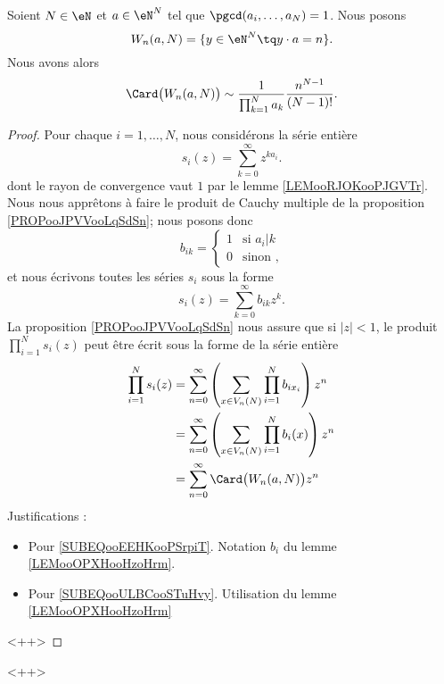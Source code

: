 \begin{theorem} \label{THOooQDYWooCOiUMb}
    Soient \( N\in \eN\) et \( a\in \eN^N\) tel que \( \pgcd(a_i,\ldots, a_{N})=1\). Nous posons
    \begin{equation}
        W_n(a,N)=\{ y\in \eN^N\tq y\cdot a=n \}.
    \end{equation}
    Nous avons alors
    \begin{equation}
        \Card\big( W_n(a,N) \big)\sim\frac{1}{ \prod_{k=1}^Na_k }\frac{ n^{N-1} }{ (N-1)! }.
    \end{equation}
\end{theorem}


\begin{proof}
    Pour chaque \( i=1,\ldots, N\), nous considérons la série entière
    \begin{equation}
        s_i(z)=\sum_{k=0}^{\infty}z^{ka_i}.
    \end{equation}
    dont le rayon de convergence vaut \( 1\) par le lemme \ref{LEMooRJOKooPJGVTr}. Nous nous apprêtons à faire le produit de Cauchy multiple de la proposition \ref{PROPooJPVVooLqSdSn}; nous posons donc
    \begin{equation}
        b_{ik}=\begin{cases}
            1    &   \text{si } a_i|k\\
            0    &    \text{sinon },
        \end{cases}
    \end{equation}
    et nous écrivons toutes les séries \( s_i\) sous la forme
    \begin{equation}
        s_i(z)=\sum_{k=0}^{\infty}b_{ik}z^k.
    \end{equation}
    La proposition \ref{PROPooJPVVooLqSdSn} nous assure que si \( | z |<1\), le produit \( \prod_{i=1}^Ns_i(z)\) peut être écrit sous la forme de la série entière
    \begin{subequations}
        \begin{align}
            \prod_{i=1}^Ns_i(z)&=\sum_{n=0}^{\infty}\left( \sum_{x\in V_n(N)}\prod_{i=1}^Nb_{ix_i} \right)z^n\\
            &=\sum_{n=0}^{\infty}\left( \sum_{x\in V_n(N)}\prod_{i=1}^Nb_i(x) \right)z^n        \label{SUBEQooEEHKooPSrpiT} \\
            &=\sum_{n=0}^{\infty}\Card\big( W_n(a,N) \big)z^n       \label{SUBEQooULBCooSTuHvy}
        \end{align}
    \end{subequations}
    Justifications :
    \begin{itemize}
        \item Pour \eqref{SUBEQooEEHKooPSrpiT}. Notation \( b_i\) du lemme \ref{LEMooOPXHooHzoHrm}.
        \item Pour \eqref{SUBEQooULBCooSTuHvy}. Utilisation du lemme \ref{LEMooOPXHooHzoHrm}
    \end{itemize}
    <++>
    
\end{proof}
<++>


